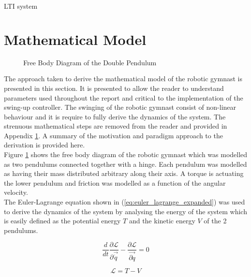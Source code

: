 LTI system


\section{Mathematical Model}
\label{sec:math_model}
\begin{figure}[h]
	\centering
	
	\caption{Free Body Diagram of the Double Pendulum}
	\label{fig:doublePen}
\end{figure}

The approach taken to derive the mathematical model of the robotic gymnast is presented in this section. It is presented to allow the reader to understand parameters used throughout the report and critical to the implementation of the swing-up controller. The swinging of the robotic gymnast consist of non-linear behaviour and it is  require to fully derive the dynamics of the system. The strenuous mathematical steps are removed from the reader and provided in Appendix \ref{sec:math_model}. A summary of the motivation and paradigm approach to the derivation is provided here.\\

 Figure \ref{fig:doublePen} shows the free body diagram of the robotic gymnast which was modelled as two pendulums connected together with a hinge. Each pendulum was modelled as having their mass distributed arbitrary along their axis. A torque is actuating the lower pendulum and friction was modelled as a function of the angular velocity.\\

The Euler-Lagrange equation shown in (\ref{eq:euler_lagrange_expanded}) was used to derive the dynamics of the system by analysing the energy of the system which is easily defined as the potential energy $T$ and the kinetic energy $V$ of the 2 pendulums.
 
\begin{equation} \label{eq:euler_lagrange_expanded}
\frac{d}{dt}\frac{\partial\mathcal{L}}{\partial\vec{\dot{q}}}-\frac{\partial\mathcal{L}}{ \vec{\partial q}} = 0
\end{equation}

\begin{equation} \label{eq:euler_lagrane}
\mathcal{L}=T-V
\end{equation}

